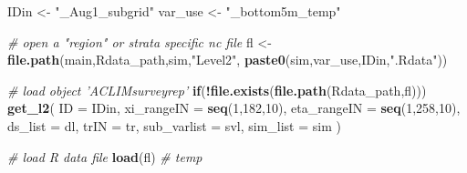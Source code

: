 \documentclass[
]{article}
\newenvironment{Shaded}{\begin{snugshade}}{\end{snugshade}}
\newcommand{\CommentTok}[1]{\textcolor[rgb]{0.56,0.35,0.01}{\textit{#1}}}
\newcommand{\ControlFlowTok}[1]{\textcolor[rgb]{0.13,0.29,0.53}{\textbf{#1}}}
\newcommand{\DataTypeTok}[1]{\textcolor[rgb]{0.13,0.29,0.53}{#1}}
\newcommand{\DecValTok}[1]{\textcolor[rgb]{0.00,0.00,0.81}{#1}}
\newcommand{\KeywordTok}[1]{\textcolor[rgb]{0.13,0.29,0.53}{\textbf{#1}}}
\newcommand{\NormalTok}[1]{#1}
\newcommand{\OperatorTok}[1]{\textcolor[rgb]{0.81,0.36,0.00}{\textbf{#1}}}
\newcommand{\StringTok}[1]{\textcolor[rgb]{0.31,0.60,0.02}{#1}}
\begin{document}
\begin{Shaded}
\begin{Highlighting}[]
\NormalTok{    IDin       <-}\StringTok{ "_Aug1_subgrid"}
\NormalTok{    var_use    <-}\StringTok{ "_bottom5m_temp"}
    
    \CommentTok{# open a "region" or strata specific nc file}
\NormalTok{    fl         <-}\StringTok{ }\KeywordTok{file.path}\NormalTok{(main,Rdata_path,sim,}\StringTok{"Level2"}\NormalTok{,}
                            \KeywordTok{paste0}\NormalTok{(sim,var_use,IDin,}\StringTok{".Rdata"}\NormalTok{))}
    
    \CommentTok{# load object 'ACLIMsurveyrep'}
    \ControlFlowTok{if}\NormalTok{(}\OperatorTok{!}\KeywordTok{file.exists}\NormalTok{(}\KeywordTok{file.path}\NormalTok{(Rdata_path,fl)))}
      \KeywordTok{get_l2}\NormalTok{(}
        \DataTypeTok{ID          =}\NormalTok{ IDin,}
        \DataTypeTok{xi_rangeIN  =} \KeywordTok{seq}\NormalTok{(}\DecValTok{1}\NormalTok{,}\DecValTok{182}\NormalTok{,}\DecValTok{10}\NormalTok{),}
        \DataTypeTok{eta_rangeIN =} \KeywordTok{seq}\NormalTok{(}\DecValTok{1}\NormalTok{,}\DecValTok{258}\NormalTok{,}\DecValTok{10}\NormalTok{),}
        \DataTypeTok{ds_list     =}\NormalTok{ dl,}
        \DataTypeTok{trIN        =}\NormalTok{ tr,}
        \DataTypeTok{sub_varlist =}\NormalTok{ svl,  }
        \DataTypeTok{sim_list    =}\NormalTok{ sim  )}
    
    \CommentTok{# load R data file}
    \KeywordTok{load}\NormalTok{(fl)   }\CommentTok{# temp}
    

\end{Highlighting}
\end{Shaded}
\end{document}
